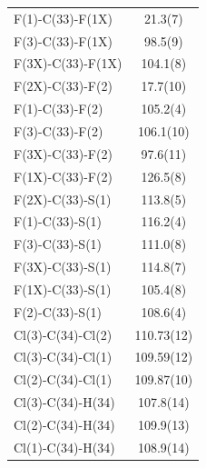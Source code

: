 \begin{center}
{\begin{supertabular}{p{1.5in}c}
F(1)-C(33)-F(1X)&21.3(7)\\
F(3)-C(33)-F(1X)&98.5(9)\\
F(3X)-C(33)-F(1X)&104.1(8)\\
F(2X)-C(33)-F(2)&17.7(10)\\
F(1)-C(33)-F(2)&105.2(4)\\
F(3)-C(33)-F(2)&106.1(10)\\
F(3X)-C(33)-F(2)&97.6(11)\\
F(1X)-C(33)-F(2)&126.5(8)\\
F(2X)-C(33)-S(1)&113.8(5)\\
F(1)-C(33)-S(1)&116.2(4)\\
F(3)-C(33)-S(1)&111.0(8)\\
F(3X)-C(33)-S(1)&114.8(7)\\
F(1X)-C(33)-S(1)&105.4(8)\\
F(2)-C(33)-S(1)&108.6(4)\\
Cl(3)-C(34)-Cl(2)&110.73(12)\\
Cl(3)-C(34)-Cl(1)&109.59(12)\\
Cl(2)-C(34)-Cl(1)&109.87(10)\\
Cl(3)-C(34)-H(34)&107.8(14)\\
Cl(2)-C(34)-H(34)&109.9(13)\\
Cl(1)-C(34)-H(34)&108.9(14)\\
\end{supertabular}
}
\end{center}

